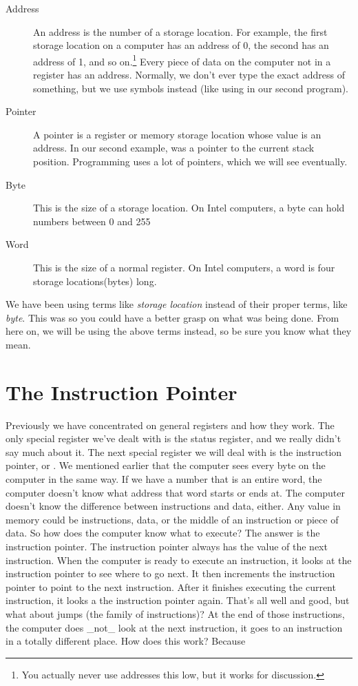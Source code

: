 \begin{description}
\item[Address] An address is the number of a storage location.  For example, the first
storage location on a computer has an address of 0, the second has
an address of 1, and so on.\footnote{You actually never use
addresses this low, but it works for discussion.}
Every piece of data on the computer not in a register has an address.
Normally, we don't ever type the exact address of something, but we
use symbols instead (like using  in our
second program).
\item[Pointer] A pointer is a register or memory storage location whose value is an 
address.  In our second example, \icode{{\ebpBare}} was a pointer
to the current stack position.  Programming uses a lot of pointers,
which we will see eventually.
\item[Byte] This is the size of a storage location.  On Intel computers, a byte
can hold numbers between 0 and 255
\item[Word] This is the size of a normal register.  On Intel computers, a word
is four storage locations(bytes) long.
\end{description}

We have been using terms like \emph{storage location} instead
of their proper terms, like \emph{byte}.  This was so you
could have a better grasp on what was being done.  From here on, we
will be using the above terms instead, so be sure you know what they mean.

\section{The Instruction Pointer}

Previously we have concentrated on general registers and how they work.
The only special register we've dealt with is the status register, and
we really didn't say much about it.  The next special register we will
deal with is the instruction pointer, or \icode{{\eipBare}}.
We mentioned earlier that the computer sees every byte on the computer
in the same way.  If we have a number that is an entire word, the computer
doesn't know what address that word starts or ends at.  The computer doesn't know
the difference between instructions and data, either.  Any value in memory could be 
instructions, data, or the middle of an instruction or piece of data.  So how does the computer
know what to execute?  The answer is the instruction pointer.  The
instruction pointer always has the value of the next instruction.  When
the computer is ready to execute an instruction, it looks at the
instruction pointer to see where to go next.  It then increments the
instruction pointer to point to the next instruction.  After it finishes
executing the current instruction, it looks a the instruction pointer
again.  That's all well and good, but what about jumps (the 
 family of instructions)?  At the end of those
instructions, the computer does \_not\_ look at the next instruction,
it goes to an instruction in a totally different place.  How does this
work?  Because 

